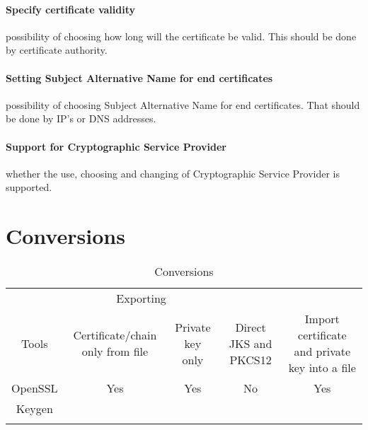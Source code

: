 \documentclass[10pt, a4paper]{report}
\begin{document}
\paragraph{Specify certificate validity}
possibility of choosing how long will the certificate be valid. This should be done by certificate authority.

\paragraph{Setting Subject Alternative Name for end certificates}
possibility of choosing Subject Alternative Name for end certificates. That should be done by IP's or DNS addresses.

\paragraph{Support for Cryptographic Service Provider}
whether the use, choosing and changing of Cryptographic Service Provider is supported.


\section{Conversions}

\begin{table}[h!]
\centering
\caption{Conversions}
\label{my-label}
\begin{adjustbox}{max width=\textwidth}
\begin{tabular}{|c|c|c|c|c|}
\hline
                        & \multicolumn{2}{c|}{Exporting}                                 &                                         &                                                                  \\ \cline{2-3}
\multirow{-2}{*}{Tools} & Certificate/chain only from file & Private key only            & \multirow{-2}{*}{Direct JKS and PKCS12} & \multirow{-2}{*}{Import certificate and private key into a file} \\ \hline
OpenSSL                 & \cellcolor[HTML]{34FF34}Yes      & \cellcolor[HTML]{34FF34}Yes & \cellcolor[HTML]{FF3A3A}No              & \cellcolor[HTML]{34FF34}Yes                                      \\ \hline
Keygen                  &                                  &                             &                                         &                                                                  \\ \hline
                        &                                  &                             &                                         &                                                                  \\ \hline
\end{tabular}
\end{adjustbox}
\end{table}
\end{document}
